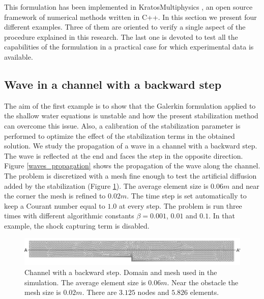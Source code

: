 \documentclass[a4paper,12pt]{article}
\newcommand\IgnasiCorregit[1]{\ifthenelse{\boolean{show_corregit}}{\textcolor{blue}{#1}}{}}
\begin{document}
This formulation has been implemented in KratosMultiphysics \cite{dadvand2010, dadvand2013}, an open source framework of numerical methods written in C++. 
In this section we present four different examples. Three of them are oriented to verify a single aspect of the procedure explained in this research. The last one is devoted to test all the capabilities of the formulation in a practical case for which experimental data is available.


\subsection{Wave in a channel with a backward step}

The aim of the first example is to show that the Galerkin formulation applied to the shallow water equations is unstable and how the present stabilization method can overcome this issue. Also, a calibration of the stabilization parameter is performed to optimize the effect of the stabilization terms in the obtained solution.
We study the propagation of a wave in a channel with a backward step. The wave is reflected at the end and faces the step in the opposite direction. Figure \ref{waves_propagation} shows the propagation of the wave along the channel.
The problem is discretized with a mesh fine enough to test the artificial diffusion added by the stabilization (Figure \ref{step_mesh}). The average element size is $0.06m$ and near the corner the mesh is refined to $0.02m$.
The time step is set automatically to keep a Courant number equal to $1.0$ at every step. The problem is run three times with different algorithmic constants $\beta = 0.001$, $0.01$ and $0.1$. In that example, the shock capturing term is disabled.

\begin{figure}
    \includegraphics[width=\textwidth]{img/step/mesh.pdf}
    \caption{Channel with a backward step. Domain and mesh used in the simulation. The average element size is $0.06m$. Near the obstacle the mesh size is $0.02m$. There are $3.125$ nodes and $5.826$ elements.}
    \label{step_mesh}
\end{figure}
\end{document}
